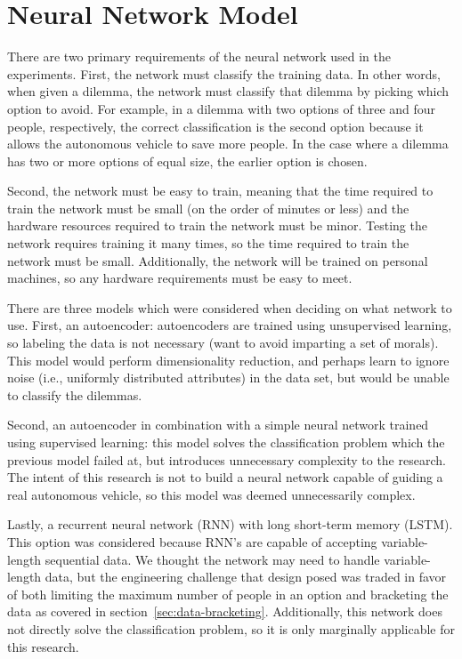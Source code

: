 \documentclass[paper=a4paper]{report}
\begin{document}
\FloatBarrier
\section{Neural Network Model}

There are two primary requirements of the neural network used in the experiments. First, the network
must classify the training data. In other words, when given a dilemma, the network must classify
that dilemma by picking which option to avoid. For example, in a dilemma with two options of three
and four people, respectively, the correct classification is the second option because it allows the
autonomous vehicle to save more people. In the case where a dilemma has two or more options of equal
size, the earlier option is chosen.

Second, the network must be easy to train, meaning that the time required to train the network must
be small (on the order of minutes or less) and the hardware resources required to train the network
must be minor. Testing the network requires training it many times, so the time required to train
the network must be small. Additionally, the network will be trained on personal machines, so any
hardware requirements must be easy to meet.

There are three models which were considered when deciding on what network to use. First, an
autoencoder: autoencoders are trained using unsupervised learning, so labeling the data is not
necessary (want to avoid imparting a set of morals). This model would perform dimensionality
reduction, and perhaps learn to ignore noise (i.e., uniformly distributed attributes) in the data
set, but would be unable to classify the dilemmas.

Second, an autoencoder in combination with a simple neural network trained using supervised
learning: this model solves the classification problem which the previous model failed at, but
introduces unnecessary complexity to the research. The intent of this research is not to build a
neural network capable of guiding a real autonomous vehicle, so this model was deemed unnecessarily
complex.

Lastly, a recurrent neural network (RNN) with long short-term memory (LSTM). This option was
considered because RNN's are capable of accepting variable-length sequential data. We thought the
network may need to handle variable-length data, but the engineering challenge that design posed was
traded in favor of both limiting the maximum number of people in an option and bracketing the data
as covered in section~\ref{sec:data-bracketing}. Additionally, this network does not directly solve
the classification problem, so it is only marginally applicable for this research.
\end{document}
